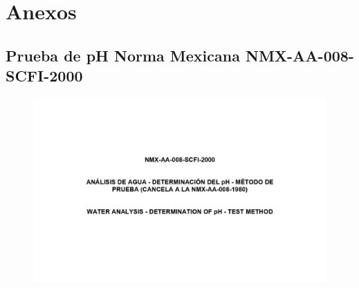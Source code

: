 \section*{Anexos}
\subsection*{Prueba de pH Norma Mexicana NMX-AA-008-SCFI-2000}
\begin{center}
	\begin{figure}[h]
		\includegraphics*[scale=0.825]{../Images/nmx-aa-008-scfi-2000_pages-to-jpg-0032.jpg}
	\end{figure}
\end{center}
\clearpage
